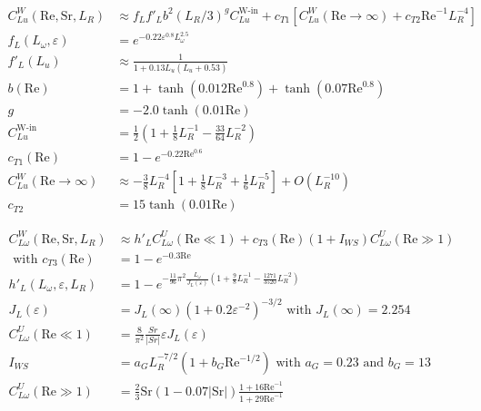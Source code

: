\npar
\begin{align}
C_{Lu}^{W}\left(\text{Re}, \text{Sr}, L_{R}\right) &\approx f_{L} f'_{L} b^{2}\left(L_{R}/3\right)^{g}C_{Lu}^{\text{W-in}}+c_{T1}\left[C_{Lu}^{W}\left(\text{Re} \rightarrow \infty\right) + c_{T2}\text{Re}^{-1}L_{R}^{-4}\right]\\
f_{L}\left(L_{\omega},\varepsilon\right) &= e^{-0.22 \varepsilon^{0.8}L_{\omega}^{2.5}} \\
f'_{L}\left(L_{u}\right)&\approx\frac{1}{1+0.13L_{u}\left(L_{u}+0.53\right)}\\
b\left(\text{Re}\right)&= 1 + \tanh\left(0.012\text{Re}^{0.8}\right)+\tanh\left(0.07\text{Re}^{0.8}\right) \\
g&= -2.0\tanh\left(0.01\text{Re}\right)\\
C_{Lu}^{\text{W-in}}&=\frac{1}{2}\left(1+\frac{1}{8}L_{R}^{-1}-\frac{33}{64}L_{R}^{-2}\right)\\
c_{T1}\left(\text{Re}\right)&=1-e^{-0.22\text{Re}^{0.6}} \\
C_{Lu}^{W}\left(\text{Re}\rightarrow \infty \right)&\approx -\frac{3}{8}L_{R}^{-4}\left[1+\frac{1}{8}L_{R}^{-3}+\frac{1}{6}L_{R}^{-5}\right] + O\left(L_{R}^{-10}\right)\\
c_{T2}&=15 \tanh\left( 0.01\text{Re} \right)
\end{align}


\npar
\begin{align}
C_{L\omega}^{W}\left(\text{Re}, \text{Sr}, L_{R}\right) &\approx h'_{L}C_{L\omega}^{U}\left(\text{Re}\ll 1\right) + c_{T3}\left(\text{Re}\right)\left(1+I_{WS}\right)C_{L\omega}^{U}\left(\text{Re}\gg 1\right) \\
\text{ with } c_{T3}\left(\text{Re}\right) &= 1-e^{-0.3\text{Re}}\\
h'_{L}\left(L_{\omega}, \varepsilon, L_{R}\right)&=1-e^{ -\frac{11}{96}\pi^{2}\frac{L_{\omega}}{J_{L}(\varepsilon)}\left(1+\frac{9}{8}L_{R}^{-1}-\frac{1271}{3520}L_{R}^{-2}\right)} \\
J_{L}(\varepsilon)&=J_{L}\left(\infty\right)\left(1+0.2\varepsilon^{-2}\right)^{-3/2} \text{ with } J_{L}\left(\infty\right)=2.254 \\
C_{L \omega}^{U}\left(\text{Re}\ll 1\right) &= \frac{8}{\pi^{2}} \frac{Sr}{\left|Sr\right|}\varepsilon J_{L}(\varepsilon)\\
I_{WS}&=a_{G}L_{R}^{-7/2}\left(1+b_{G}\text{Re}^{-1/2}\right) \text{ with } a_{G}=0.23 \text { and } b_{G}=13\\
C_{L \omega}^{U}\left(\text{Re}\gg 1 \right)&=\frac{2}{3}\text{Sr}\left(1-0.07\left|\text{Sr}\right|\right)\frac{1+16\text{Re}^{-1}}{1+29\text{Re}^{-1}}
\end{align}





